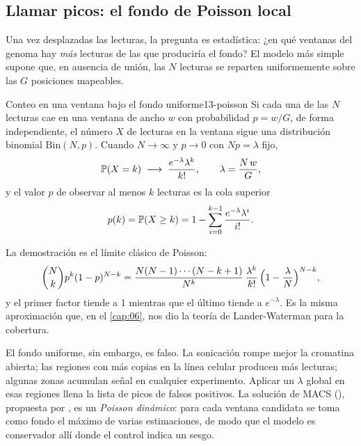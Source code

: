 \subsection{Llamar picos: el fondo de Poisson local}

Una vez desplazadas las lecturas, la pregunta es estadística: ¿en qué ventanas del genoma hay \emph{más} lecturas de las que produciría el fondo? El modelo más simple supone que, en ausencia de unión, las $N$ lecturas se reparten uniformemente sobre las $G$ posiciones mapeables.

\begin{teorema}{Conteo en una ventana bajo el fondo uniforme}{13-poisson}
Si cada una de las $N$ lecturas cae en una ventana de ancho $w$ con probabilidad $p=w/G$, de forma independiente, el número $X$ de lecturas en la ventana sigue una distribución binomial $\mathrm{Bin}(N,p)$. Cuando $N\to\infty$ y $p\to0$ con $Np=\lambda$ fijo,
\begin{equation}\label{eq:13-poisson}
\mathbb{P}(X=k) \;\longrightarrow\; \frac{e^{-\lambda}\lambda^{k}}{k!},\qquad \lambda=\frac{N\,w}{G},
\end{equation}
y el valor $p$ de observar al menos $k$ lecturas es la cola superior
\begin{equation}\label{eq:13-pvalor}
p(k) = \mathbb{P}(X\ge k) = 1-\sum_{i=0}^{k-1}\frac{e^{-\lambda}\lambda^{i}}{i!}.
\end{equation}
\end{teorema}

\begin{simbolos}
\end{simbolos}

La demostración es el límite clásico de Poisson:
\[
\binom{N}{k}p^k(1-p)^{N-k} = \frac{N(N-1)\cdots(N-k+1)}{N^k}\,\frac{\lambda^k}{k!}\,\Bigl(1-\frac{\lambda}{N}\Bigr)^{N-k},
\]
y el primer factor tiende a 1 mientras que el último tiende a $e^{-\lambda}$. Es la misma aproximación que, en el \cref{cap:06}, nos dio la teoría de Lander-Waterman para la cobertura.

El fondo uniforme, sin embargo, es falso. La sonicación rompe mejor la cromatina abierta; las regiones con más copias en la línea celular producen más lecturas; algunas zonas acumulan señal en cualquier experimento. Aplicar un $\lambda$ global en esas regiones llena la lista de picos de falsos positivos. La solución de MACS (), propuesta por \textcite{c13-zhang2008}, es un \emph{Poisson dinámico}: para cada ventana candidata se toma como fondo el máximo de varias estimaciones, de modo que el modelo es conservador allí donde el control indica un sesgo.

